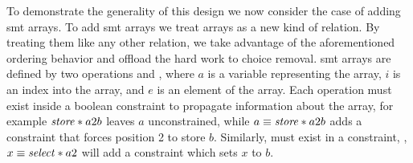 To demonstrate the generality of this design we now consider the case of adding
\ac{smt} arrays. To add \ac{smt} arrays we treat arrays as a new kind of
relation. By treating them like any other relation, we take advantage of the
aforementioned ordering behavior and offload the hard work to choice removal.
\ac{smt} arrays are defined by two operations  and
, where $a$ is a variable representing the array, $i$ is an index
into the array, and $e$ is an element of the array. Each operation must exist
inside a boolean constraint to propagate information about the array, for
example $\mathit{store}*{a}{2}{b}$ leaves $a$ unconstrained, while $a \equiv
\mathit{store}*{a}{2}{b}$ adds a constraint that forces position 2 to store $b$.
Similarly, \select{} must exist in a constraint, \eg{}, $x \equiv
\mathit{select}*{a}{2}$ will add a constraint which sets $x$ to $b$.

